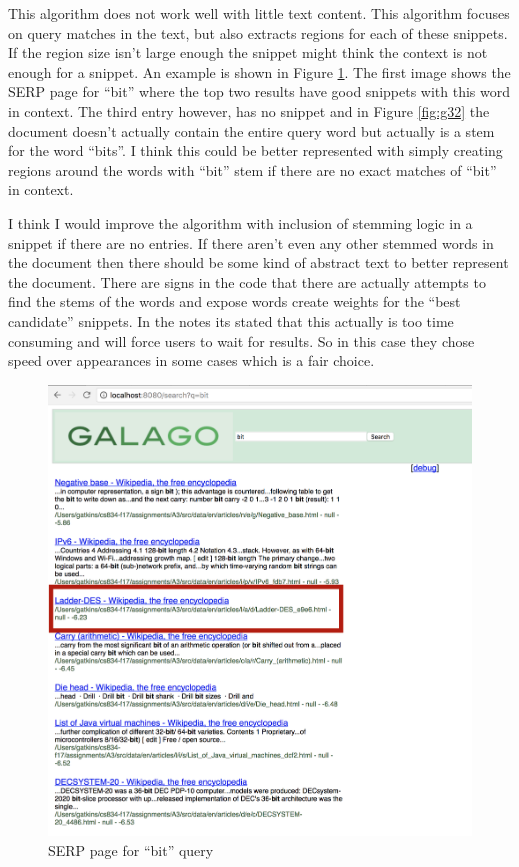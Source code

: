 \documentclass[letterpaper,11pt]{article}
\begin{document}
This algorithm does not work well with little text content.
This algorithm focuses on query matches in the text, but also extracts regions for each of these snippets.
If the region size isn't large enough the snippet might think the context is not enough for a snippet.
An example is shown in Figure \ref{fig:g3}.
The first image shows the SERP page for ``bit'' where the top two results have good snippets with this word in context.
The third entry however, has no snippet and in Figure \ref{fig:g32} the document doesn't actually contain the entire query word but actually is a stem for the word ``bits''.
I think this could be better represented with simply creating regions around the words with ``bit'' stem if there are no exact matches of ``bit'' in context.

I think I would improve the algorithm with inclusion of stemming logic in a snippet if there are no entries.
If there aren't even any other stemmed words in the document then there should be some kind of abstract text to better represent the document.
There are signs in the code that there are actually attempts to find the stems of the words and expose words create weights for the ``best candidate'' snippets.
In the notes its stated that this actually is too time consuming and will force users to wait for results.
So in this case they chose speed over appearances in some cases which is a fair choice.

\begin{figure}[h]
\centering
\includegraphics[scale=0.4]{galago3.png}
\caption{SERP page for ``bit'' query}
\label{fig:g3}
\end{figure}
\end{document}
